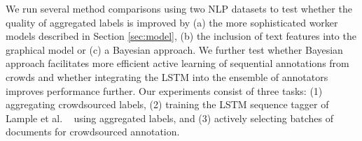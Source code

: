 We run several method comparisons using two NLP datasets to test whether the quality of aggregated labels is 
improved by (a) the more sophisticated worker models described in Section \ref{sec:model},
(b) the inclusion of text features into the graphical model or (c) a Bayesian approach. 
We further test whether Bayesian approach facilitates more efficient active learning of sequential annotations from crowds and whether integrating the LSTM into the ensemble of annotators improves performance further.
Our experiments consist of three tasks: (1) aggregating crowdsourced labels, (2) training the LSTM sequence tagger of Lample et al. ~ using aggregated labels, and (3) actively selecting batches of documents for crowdsourced annotation.
\begin{figure}
\centering
{}\\
\end{figure}
